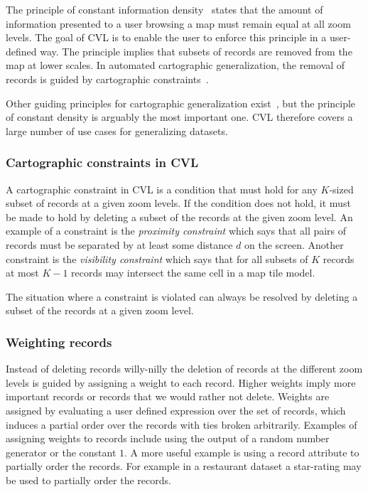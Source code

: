 The principle of constant information density~\cite{toepfer} states that the amount of information presented to a user browsing a map must remain equal at all zoom levels. The goal of CVL is to enable the user to enforce this principle in a user-defined way. The principle implies that subsets of records are removed from the map at lower scales. In automated cartographic generalization, the removal of records is guided by cartographic constraints~\cite{something}.

Other guiding principles for cartographic generalization exist~\cite{something}, but the principle of constant density is arguably the most important one. CVL therefore covers a large number of use cases for generalizing datasets.

\subsubsection{Cartographic constraints in CVL}

A cartographic constraint in CVL is a condition that must hold for any $K$-sized subset of records at a given zoom levels. If the condition does not hold, it must be made to hold by deleting a subset of the records at the given zoom level. An example of a constraint is the \emph{proximity constraint} which says that all pairs of records must be separated by at least some distance $d$ on the screen. Another constraint is the \emph{visibility constraint} which says that for all subsets of $K$ records at most $K-1$ records may intersect the same cell in a map tile model.

The situation where a constraint is violated can always be resolved by deleting a subset of the records at a given zoom level.


\subsubsection{Weighting records}
Instead of deleting records willy-nilly the deletion of records at the different zoom levels is guided by assigning a weight to each record. Higher weights imply more important records or records that we would rather not delete. Weights are assigned by evaluating a user defined expression over the set of records, which induces a partial order over the records with ties broken arbitrarily. Examples of assigning weights to records include using the output of a random number generator or the constant $1$. A more useful example is using a record attribute to partially order the records. For example in a restaurant dataset a star-rating may be used to partially order the records.

